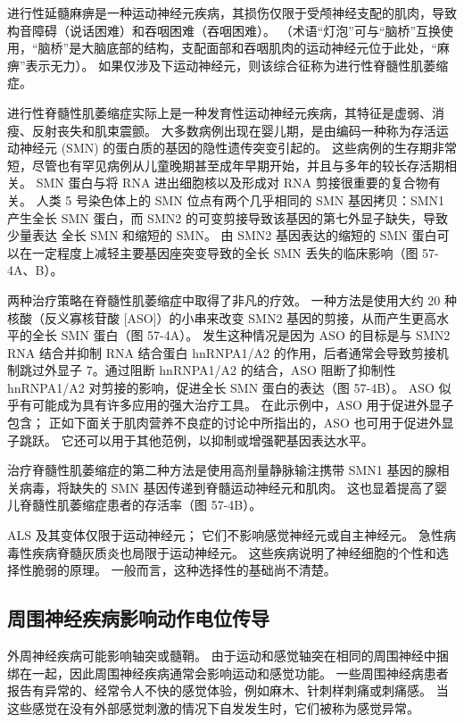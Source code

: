 进行性延髓麻痹是一种运动神经元疾病，其损伤仅限于受颅神经支配的肌肉，导致构音障碍（说话困难）和吞咽困难（吞咽困难）。 （术语“灯泡”可与“脑桥”互换使用，“脑桥”是大脑底部的结构，支配面部和吞咽肌肉的运动神经元位于此处，“麻痹”表示无力）。 如果仅涉及下运动神经元，则该综合征称为进行性脊髓性肌萎缩症。

进行性脊髓性肌萎缩症实际上是一种发育性运动神经元疾病，其特征是虚弱、消瘦、反射丧失和肌束震颤。 大多数病例出现在婴儿期，是由编码一种称为存活运动神经元 (SMN) 的蛋白质的基因的隐性遗传突变引起的。 这些病例的生存期非常短，尽管也有罕见病例从儿童晚期甚至成年早期开始，并且与多年的较长存活期相关。 SMN 蛋白与将 RNA 进出细胞核以及形成对 RNA 剪接很重要的复合物有关。 人类 5 号染色体上的 SMN 位点有两个几乎相同的 SMN 基因拷贝：SMN1 产生全长 SMN 蛋白，而 SMN2 的可变剪接导致该基因的第七外显子缺失，导致少量表达 全长 SMN 和缩短的 SMN。 由 SMN2 基因表达的缩短的 SMN 蛋白可以在一定程度上减轻主要基因座突变导致的全长 SMN 丢失的临床影响（图 57-4A、B）。

两种治疗策略在脊髓性肌萎缩症中取得了非凡的疗效。 一种方法是使用大约 20 种核酸（反义寡核苷酸 [ASO]）的小串来改变 SMN2 基因的剪接，从而产生更高水平的全长 SMN 蛋白（图 57-4A）。 发生这种情况是因为 ASO 的目标是与 SMN2 RNA 结合并抑制 RNA 结合蛋白 hnRNPA1/A2 的作用，后者通常会导致剪接机制跳过外显子 7。通过阻断 hnRNPA1/A2 的结合，ASO 阻断了抑制性 hnRNPA1/A2 对剪接的影响，促进全长 SMN 蛋白的表达（图 57-4B）。 ASO 似乎有可能成为具有许多应用的强大治疗工具。 在此示例中，ASO 用于促进外显子包含； 正如下面关于肌肉营养不良症的讨论中所指出的，ASO 也可用于促进外显子跳跃。 它还可以用于其他范例，以抑制或增强靶基因表达水平。

治疗脊髓性肌萎缩症的第二种方法是使用高剂量静脉输注携带 SMN1 基因的腺相关病毒，将缺失的 SMN 基因传递到脊髓运动神经元和肌肉。 这也显着提高了婴儿脊髓性肌萎缩症患者的存活率（图 57-4B）。

ALS 及其变体仅限于运动神经元； 它们不影响感觉神经元或自主神经元。 急性病毒性疾病脊髓灰质炎也局限于运动神经元。 这些疾病说明了神经细胞的个性和选择性脆弱的原理。 一般而言，这种选择性的基础尚不清楚。

\subsection{周围神经疾病影响动作电位传导}
外周神经疾病可能影响轴突或髓鞘。 由于运动和感觉轴突在相同的周围神经中捆绑在一起，因此周围神经疾病通常会影响运动和感觉功能。 一些周围神经病患者报告有异常的、经常令人不快的感觉体验，例如麻木、针刺样刺痛或刺痛感。 当这些感觉在没有外部感觉刺激的情况下自发发生时，它们被称为感觉异常。

